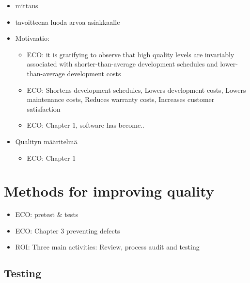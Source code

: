 ﻿\documentclass[12pt,a4paper,finnish]{tutthesis}
\begin{document}
 \begin{itemize}
 
 \item mittaus
 
 \item tavoitteena luoda arvoa asiakkaalle
 
 \item Motivaatio:
 
 \begin{itemize}
 
 \item ECO: it is gratifying to observe that high quality levels are invariably associated with shorter-than-average development schedules and lower-than-average development costs
 \item ECO: Shortens development schedules, Lowers development costs, Lowers maintenance costs, Reduces warranty costs, Increases customer satisfaction
 \item ECO: Chapter 1, software has become..
 
 \end{itemize}
 
 \item Qualityn määritelmä




 \begin{itemize}
 
 \item ECO: Chapter 1
 
 \end{itemize}
 
 \end{itemize}
 
 \section{Methods for improving quality}
 
 \begin{itemize}
 
 \item ECO: pretest & tests
 
 \item ECO: Chapter 3 preventing defects 
 
 \item ROI: Three main activities: Review, process audit and testing
 
 \end{itemize}
 
 \subsection{Testing}
 
\end{document}
